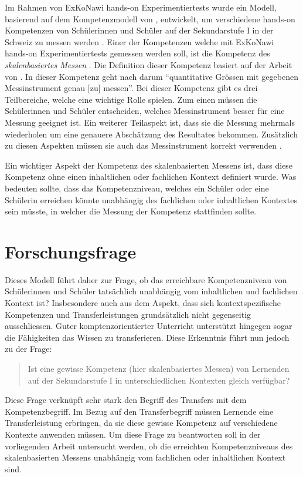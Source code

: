 Im Rahmen von ExKoNawi hands-on Experimentiertests wurde ein Modell, basierend auf dem Kompetenzmodell von \citet{Gott1996},  entwickelt, um verschiedene hands-on Kompetenzen von Schülerinnen und Schüler auf der Sekundarstufe I in der Schweiz zu messen werden \citep{Metzger2013}. Einer der Kompetenzen welche mit ExKoNawi hands-on Experimentiertests gemessen werden soll, ist die Kompetenz des \textit{skalenbasiertes Messen} \citep{Gut2013a}. Die Definition dieser Kompetenz basiert auf der Arbeit von \citet{Munier2013}. In dieser Kompetenz geht nach \citep{Gut2013a} darum "`quantitative Grössen mit gegebenen Messinstrument genau [zu] messen"'. Bei dieser Kompetenz gibt es drei Teilbereiche, welche eine wichtige Rolle spielen. Zum einen müssen die Schülerinnen und Schüler entscheiden, welches Messinstrument besser für eine Messung geeignet ist. Ein weiterer Teilaspekt ist, dass sie die Messung mehrmals wiederholen um eine genauere Abschätzung des Resultates bekommen. Zusätzlich zu diesen Aspekten müssen sie auch das Messinstrument korrekt verwenden \citep{Munier2013,Gut2013a}.

Ein wichtiger Aspekt der Kompetenz des skalenbasierten Messens ist, dass diese Kompetenz ohne einen inhaltlichen oder fachlichen Kontext definiert wurde. Was bedeuten sollte, dass das Kompetenzniveau, welches ein Schüler oder eine Schülerin erreichen könnte unabhängig des fachlichen oder inhaltlichen Kontextes sein müsste, in welcher die Messung der Kompetenz stattfinden sollte.

\section{Forschungsfrage}

Dieses Modell führt daher zur Frage, ob das erreichbare Kompetenzniveau von Schüler\-innen und Schüler tatsächlich unabhängig vom inhaltlichen und fachlichen Kontext ist? Insbesondere auch aus dem Aspekt, dass sich kontextspezifische Kompetenzen und Transferleistungen grundsätzlich nicht gegenseitig ausschliessen. Guter komptenzorientierter Unterricht unterstützt hingegen sogar die Fähigkeiten das Wissen zu transferieren. Diese Erkenntnis führt nun jedoch zu der Frage: 
\begin{quote}
Ist eine gewisse Kompetenz (hier skalenbasiertes Messen) von Lernenden auf der Sekundarstufe I in unterschiedlichen Kontexten gleich verfügbar?
\end{quote}

Diese Frage verknüpft sehr stark den Begriff des Transfers mit dem Kompetenzbegriff. Im
Bezug auf den Transferbegriff müssen Lernende eine Transferleistung erbringen, da sie
diese gewisse Kompetenz auf verschiedene Kontexte anwenden müssen. Um diese Frage zu beantworten soll in der vorliegenden Arbeit untersucht werden, ob die erreichten Kompetenzniveaus des skalenbasierten Messens unabhängig vom fachlichen oder inhaltlichen Kontext sind.



